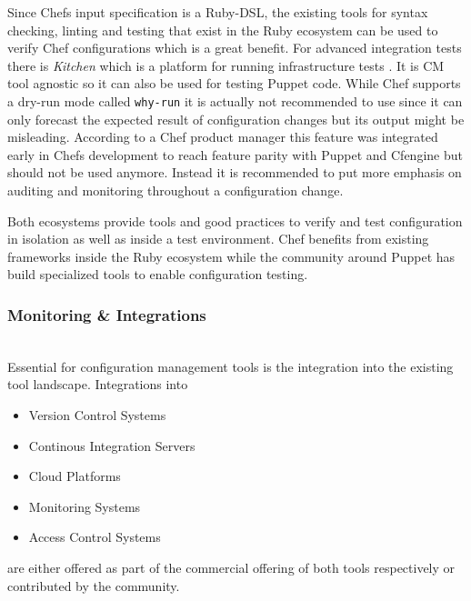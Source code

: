 Since Chefs input specification is a Ruby-DSL, the existing tools for syntax checking, linting and testing that exist in the Ruby ecosystem can be used to verify Chef configurations which is a great benefit. For advanced integration tests there is \textit{Kitchen} which is a platform for running infrastructure tests \cite{kitchen}. It is CM tool agnostic so it can also be used for testing Puppet code. While Chef supports a dry-run mode called \texttt{why-run} it is actually not recommended to use since it can only forecast the expected result of configuration changes but its output might be misleading. According to a Chef product manager this feature was integrated early in Chefs development to reach feature parity with Puppet and Cfengine but should not be used anymore. Instead it is recommended to put more emphasis on auditing and monitoring throughout a configuration change\cite{whyrun}.

Both ecosystems provide tools and good practices to verify and test configuration in isolation as well as inside a test environment. Chef benefits from existing frameworks inside the Ruby ecosystem while the community around Puppet has build specialized tools to enable configuration testing.


\subsubsection{Monitoring \& Integrations}\hfill\\

Essential for configuration management tools is the integration into the existing tool landscape. Integrations into 

\begin{itemize}
\item Version Control Systems
\item Continous Integration Servers
\item Cloud Platforms
\item Monitoring Systems
\item Access Control Systems
\end{itemize}

are either offered as part of the commercial offering of both tools respectively or contributed by the community.

